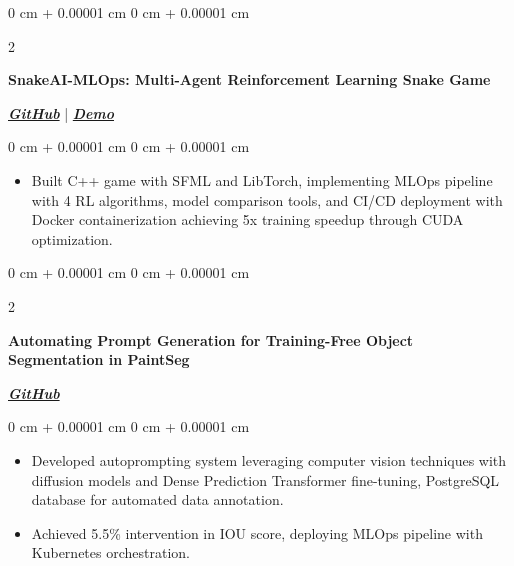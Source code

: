 \documentclass[10pt, letterpaper]{article}
\newenvironment{highlights}{
    \begin{itemize}[
        topsep=0.10 cm,
        parsep=0.10 cm,
        partopsep=0pt,
        itemsep=0pt,
        leftmargin=0 cm + 10pt
    ]
}{
    \end{itemize}
} %
\newenvironment{onecolentry}{
    \begin{adjustwidth}{
        0 cm + 0.00001 cm
    }{
        0 cm + 0.00001 cm
    }
}{
    \end{adjustwidth}
} %
\newenvironment{twocolentry}[2][]{
    \onecolentry
    \def\secondColumn{#2}
    \setcolumnwidth{\fill, 4.5 cm}
    \begin{paracol}{2}
}{
    \switchcolumn \raggedleft \secondColumn
    \end{paracol}
    \endonecolentry
} %
\begin{document}
\vspace{0.1 cm}


\begin{twocolentry}{
           \href{https://github.com/PranavMishra17/SnakeAI-MLOps}{\textbf{\textit{GitHub}}} | \href{https://pranavmishra17.github.io/SnakeAI-MLOps/}{\textbf{\textit{Demo}}}
       }
           \textbf{SnakeAI-MLOps: Multi-Agent Reinforcement Learning Snake Game}
\end{twocolentry}
\vspace{0.10 cm}
\begin{onecolentry}
   \begin{highlights}
\item Built C++ game with SFML and LibTorch, implementing MLOps pipeline with 4 RL algorithms, model comparison tools, and CI/CD deployment with Docker containerization achieving 5x training speedup through CUDA optimization.
   \end{highlights}
\end{onecolentry}
\vspace{0.1 cm}

\begin{twocolentry}{
           \href{https://github.com/PranavMishra17/Auto-Prompting-for-PaintSeg}{\textbf{\textit{GitHub}}}
       }
           \textbf{Automating Prompt Generation for Training-Free Object Segmentation in PaintSeg}
\end{twocolentry}
\vspace{0.10 cm}
\begin{onecolentry}
   \begin{highlights}
\item Developed autoprompting system leveraging computer vision techniques with diffusion models and Dense Prediction Transformer fine-tuning, PostgreSQL database for automated data annotation.
   \end{highlights}
   \begin{highlights}
\item Achieved 5.5\% intervention in IOU score, deploying MLOps pipeline with Kubernetes orchestration.
   \end{highlights}
\end{onecolentry}

\vspace{0.1 cm}
\end{document}

